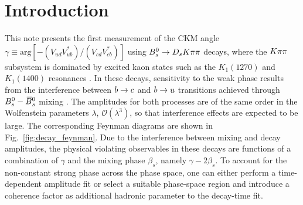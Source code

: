 
\section{Introduction}
\label{sec:Introduction}


This note presents the first measurement of the CKM angle $\gamma \equiv \text{arg}[-(V_{ud}V_{ub}^{*})/(V_{cd}V_{cb}^{*})]$ using ${{B}^0_{s}}\rightarrow{\ensuremath{{D}_{s}}}{\ensuremath{K}}\pi\pi$ decays, 
where the ${K}{\pi}{\pi}$ subsystem is dominated by excited kaon states such as the $K_{1}(1270)$ and $K_{1}(1400)$ resonances \cite{Blusk:1471393,Blusk:2012it}.
In these decays, sensitivity to the weak phase results from the
interference between ${b}\rightarrow{\ensuremath{c}}$ and ${b}\rightarrow{\ensuremath{u}}$  transitions achieved through ${{B}^0_{s}}-{{\kern 0.18em\overline{\kern -0.18em B}{}}{}^0_{s}}$ mixing \cite{Fleischer:2003yb,DeBruyn:2012jp}. 
The amplitudes for both processes are of the same order in the Wolfenstein parameters $\lambda$, $\mathcal O(\lambda^3)$, so that interference
effects are expected to be large. 
The corresponding Feynman diagrams are shown in Fig.~\ref{fig:decay_feynman}.
Due to the interference between mixing and decay amplitudes, the
physical \CP violating observables in these decays are functions of a combination of $\gamma$
and the mixing phase $\beta_s$, namely $\gamma - 2\beta_s$. 
To account for the non-constant strong phase across the phase space, 
one can either perform a time-dependent amplitude fit 
or select a suitable phase-space region and introduce a coherence factor as additional hadronic parameter to the decay-time fit.

